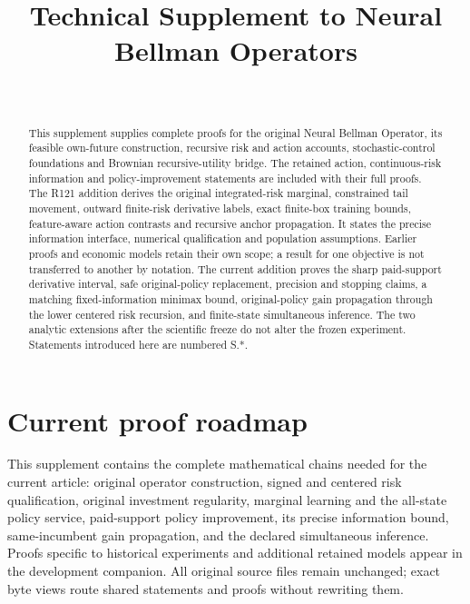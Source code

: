 \documentclass[ecta,nameyear,draft]{econsocart}
\begin{document}
\begin{frontmatter}
\title{Technical Supplement to Neural Bellman Operators}
\begin{aug}
\author[id=au1,addressref={add1}]{~}
\address[id=add1]{Peking University}
\end{aug}
\begin{abstract}This supplement supplies complete proofs for the original Neural Bellman Operator, its feasible own-future construction, recursive risk and action accounts, stochastic-control foundations and Brownian recursive-utility bridge. The retained action, continuous-risk information and policy-improvement statements are included with their full proofs. The R121 addition derives the original integrated-risk marginal, constrained tail movement, outward finite-risk derivative labels, exact finite-box training bounds, feature-aware action contrasts and recursive anchor propagation. It states the precise information interface, numerical qualification and population assumptions. Earlier proofs and economic models retain their own scope; a result for one objective is not transferred to another by notation. The current addition proves the sharp paid-support derivative interval, safe original-policy replacement, precision and stopping claims, a matching fixed-information minimax bound, original-policy gain propagation through the lower centered risk recursion, and finite-state simultaneous inference. The two analytic extensions after the scientific freeze do not alter the frozen experiment. Statements introduced here are numbered S.*. \end{abstract}
\end{frontmatter}
\section{Current proof roadmap}
This supplement contains the complete mathematical chains needed for the
current article: original operator construction, signed and centered risk
qualification, original investment regularity, marginal learning and the
all-state policy service, paid-support policy improvement, its precise
information bound, same-incumbent gain propagation, and the declared simultaneous inference. Proofs specific
to historical experiments and additional retained models appear in the
development companion. All original source files remain unchanged; exact
byte views route shared statements and proofs without rewriting them.




\end{document}

